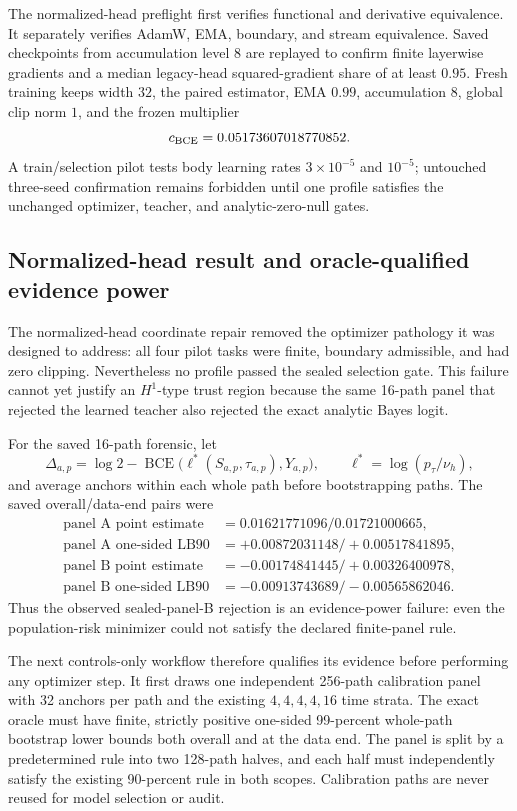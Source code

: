 \documentclass[11pt]{article}
\numberwithin{equation}{section}
\newcommand{\1}{\mathbf 1}
\begin{document}
The normalized-head preflight first verifies functional and derivative
equivalence.  It separately verifies AdamW, EMA, boundary, and stream
equivalence.  Saved checkpoints from accumulation level \(8\) are replayed to
confirm finite layerwise gradients and a median legacy-head squared-gradient
share of at least \(0.95\).  Fresh training keeps width \(32\), the paired
estimator, EMA \(0.99\), accumulation \(8\), global clip norm \(1\), and the
frozen multiplier
\[
  c_{\rm BCE}=0.05173607018770852.
\]
A train/selection pilot tests body learning rates
\(3\mathbin{\times}10^{-5}\) and \(10^{-5}\); untouched three-seed
confirmation remains forbidden until one profile satisfies the unchanged
optimizer, teacher, and analytic-zero-null gates.

\subsection{Normalized-head result and oracle-qualified evidence power}
\label{sec:density-ratio-selection-power}

The normalized-head coordinate repair removed the optimizer pathology it was
designed to address: all four pilot tasks were finite, boundary admissible,
and had zero clipping.  Nevertheless no profile passed the sealed selection
gate.  This failure cannot yet justify an \(H^1\)-type trust region because the
same 16-path panel that rejected the learned teacher also rejected the exact
analytic Bayes logit.

For the saved 16-path forensic, let
\[
  \Delta_{a,p}
  =\log 2-\operatorname{BCE}
       \bigl(\ell^*(S_{a,p},\tau_{a,p}),Y_{a,p}\bigr),
  \qquad
  \ell^*=\log(p_\tau/\nu_h),
\]
and average anchors within each whole path before bootstrapping paths.  The
saved overall/data-end pairs were
\begin{align*}
  \text{panel A point estimate} &= 0.01621771096/0.01721000665,\\
  \text{panel A one-sided LB90} &= +0.00872031148/+0.00517841895,\\
  \text{panel B point estimate} &= -0.00174841445/+0.00326400978,\\
  \text{panel B one-sided LB90} &= -0.00913743689/-0.00565862046.
\end{align*}
Thus the observed sealed-panel-B rejection is an evidence-power failure: even
the population-risk minimizer could not satisfy the declared finite-panel
rule.

The next controls-only workflow therefore qualifies its evidence before
performing any optimizer step.  It first draws one independent 256-path
calibration panel with 32 anchors per path and the existing
\(4,4,4,4,16\) time strata.  The exact oracle must have finite, strictly
positive one-sided 99-percent whole-path bootstrap lower bounds both overall
and at the data end.  The panel is split by a predetermined rule into two
128-path halves, and each half must independently satisfy the existing
90-percent rule in both scopes.  Calibration paths are never reused for model
selection or audit.
\end{document}

